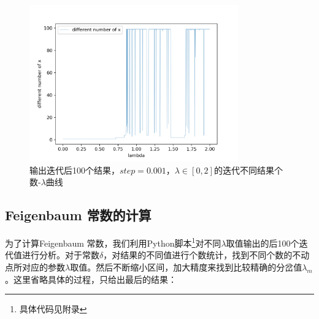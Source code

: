 \documentclass[a4paper,11pt]{article}
\begin{document}
\begin{figure}[!htbp]        
\centering
\includegraphics[bb= 0 0 450 370,width=9cm]{s=0.001-3-1.png}      
\caption{输出迭代后100个结果，$step = 0.001$，$\lambda \in [0,2]$的迭代不同结果个数-$\lambda$曲线}      
\end{figure}



\subsection{Feigenbaum 常数的计算}
为了计算Feigenbaum 常数，我们利用Python脚本\footnote{具体代码见附录}对不同$\lambda$取值输出的后100个迭代值进行分析。对于常数$\delta$，对结果的不同值进行个数统计，找到不同个数的不动点所对应的参数$\lambda$取值。然后不断缩小区间，加大精度来找到比较精确的分岔值$\lambda_{m}$。这里省略具体的过程，只给出最后的结果：


\begin{table}[!htbp]
\centering
{}
\caption{$\lambda < 0$时的Feigenbaum常数$\delta$计算结果}
\end{table}
\end{document}

